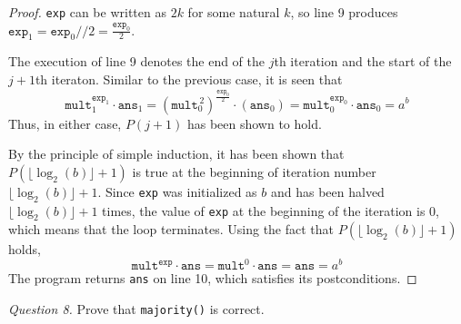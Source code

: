\documentclass[11pt]{article}
\begin{document}
\begin{enumerate}[label=(\alph*)]
\begin{proof}
            \verb|exp| can be written as \(2k\) for some natural \(k\), so line 9 produces \(\texttt{exp}_1 = \texttt{exp}_0 // 2 = \frac{\texttt{exp}_0}{2}\).

            The execution of line 9 denotes the end of the \(j\)th iteration and the start of the \(j+1\)th iteraton. Similar to the previous case, it is seen that 
            \[
                \texttt{mult}_1^{\texttt{exp}_1} \cdot \texttt{ans}_1 = (\texttt{mult}_0^{\, 2})^\frac{\texttt{exp}_0}{2} \cdot (\texttt{ans}_0) = \texttt{mult}_0^{\texttt{exp}_0} \cdot \texttt{ans}_0 = a^b
            \]
            Thus, in either case, \(P(j+1)\) has been shown to hold.

            By the principle of simple induction, it has been shown that \(P(\lfloor \log _2(b) \rfloor + 1)\) is true at the beginning of iteration number \(\lfloor \log _2(b) \rfloor + 1\). Since \verb|exp| was initialized as \(b\) and has been halved \(\lfloor \log _2(b) \rfloor + 1\) times, the value of \verb|exp| at the beginning of the iteration is 0, which means that the loop terminates. Using the fact that \(P(\lfloor \log _2(b) \rfloor + 1)\) holds,
            \[
                \texttt{mult}^\texttt{exp} \cdot \texttt{ans} = \texttt{mult}^0 \cdot \texttt{ans} = \texttt{ans} = a^b
            \]
            The program returns \verb|ans| on line 10, which satisfies its postconditions.
        \end{proof}
    \end{enumerate}
    \textit{Question 8.} Prove that \verb|majority()| is correct.
\end{document}

